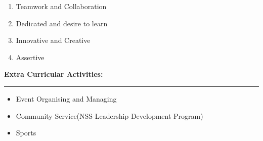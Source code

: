 \documentclass[a4paper,10pt]{article}
\begin{document}
\begin{flushleft}
\begin{enumerate}
    	\item Teamwork and Collaboration\\
    	\item Dedicated and desire to learn\\
    	\item Innovative and Creative\\
    	\item Assertive\\
    \end{enumerate}
    \textbf{\large Extra Curricular Activities:}\\
  \hrule
  \begin{itemize}
  	\item Event Organising and Managing\\
  	\item Community Service(NSS Leadership Development Program)\\
  	\item Sports\\
  \end{itemize}
  

\end{flushleft}
\end{document}
